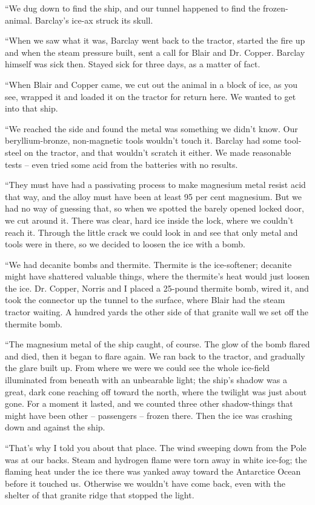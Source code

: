 \documentclass[ebook,oneside,11pt]{memoir}				%
\begin{document}
``We dug down to find the ship, and our tunnel happened to find the frozen-animal. Barclay's ice-ax struck its skull.

``When we saw what it was, Barclay went back to the tractor, started the fire up and when the steam pressure built, sent a call for Blair and Dr. Copper. Barclay himself was sick then. Stayed sick for three days, as a matter of fact.

``When Blair and Copper came, we cut out the animal in a block of ice, as you see, wrapped it and loaded it on the tractor for return here. We wanted to get into that ship.

``We reached the side and found the metal was something we didn't know. Our beryllium-bronze, non-magnetic tools wouldn't touch it. Barclay had some tool-steel on the tractor, and that wouldn't scratch it either. We made reasonable tests -- even tried some acid from the batteries with no results.

``They must have had a passivating process to make magnesium metal resist acid that way, and the alloy must have been at least 95 per cent magnesium. But we had no way of guessing that, so when we spotted the barely opened locked door, we cut around it. There was clear, hard ice inside the lock, where we couldn't reach it. Through the little crack we could look in and see that only metal and tools were in there, so we decided to loosen the ice with a bomb.

``We had decanite bombs and thermite. Thermite is the ice-softener; decanite might have shattered valuable things, where the thermite's heat would just loosen the ice. Dr. Copper, Norris and I placed a 25-pound thermite bomb, wired it, and took the connector up the tunnel to the surface, where Blair had the steam tractor waiting. A hundred yards the other side of that granite wall we set off the thermite bomb.

``The magnesium metal of the ship caught, of course. The glow of the bomb flared and died, then it began to flare again. We ran back to the tractor, and gradually the glare built up. From where we were we could see the whole ice-field illuminated from beneath with an unbearable light; the ship's shadow was a great, dark cone reaching off toward the north, where the twilight was just about gone. For a moment it lasted, and we counted three other shadow-things that might have been other -- passengers -- frozen there. Then the ice was crashing down and against the ship.

``That's why I told you about that place. The wind sweeping down from the Pole was at our backs. Steam and hydrogen flame were torn away in white ice-fog; the flaming heat under the ice there was yanked away toward the Antarctice Ocean before it touched us. Otherwise we wouldn't have come back, even with the shelter of that granite ridge that stopped the light.
\end{document}
